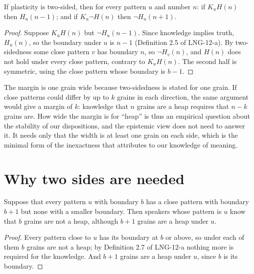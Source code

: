 \documentclass{situationist-preprint}
\begin{document}
\begin{proposition}\label{p:margin}
If plasticity is two-sided, then for every pattern $u$ and number $n$: if $K_u H(n)$ then $H_u(n-1)$; and if $K_u \neg H(n)$ then $\neg H_u(n+1)$.
\end{proposition}

\begin{proof}
Suppose $K_u H(n)$ but $\neg H_u(n-1)$. Since knowledge implies truth, $H_u(n)$, so the boundary under $u$ is $n-1$ (Definition 2.5 of LNG-12-a). By two-sidedness some close pattern $v$ has boundary $n$, so $\neg H_v(n)$, and $H(n)$ does not hold under every close pattern, contrary to $K_u H(n)$. The second half is symmetric, using the close pattern whose boundary is $b-1$.
\end{proof}

The margin is one grain wide because two-sidedness is stated for one grain. If close patterns could differ by up to $k$ grains in each direction, the same argument would give a margin of $k$: knowledge that $n$ grains are a heap requires that $n-k$ grains are. How wide the margin is for \enquote{heap} is thus an empirical question about the stability of our dispositions, and the epistemic view does not need to answer it. It needs only that the width is at least one grain on each side, which is the minimal form of the inexactness that \citet[ch.~8]{Williamson1994} attributes to our knowledge of meaning.

\section{Why two sides are needed}

\begin{proposition}\label{p:one}
Suppose that every pattern $u$ with boundary $b$ has a close pattern with boundary $b+1$ but none with a smaller boundary. Then speakers whose pattern is $u$ know that $b$ grains are not a heap, although $b+1$ grains are a heap under $u$.
\end{proposition}

\begin{proof}
Every pattern close to $u$ has its boundary at $b$ or above, so under each of them $b$ grains are not a heap; by Definition 2.7 of LNG-12-a nothing more is required for the knowledge. And $b+1$ grains are a heap under $u$, since $b$ is its boundary.
\end{proof}
\end{document}
